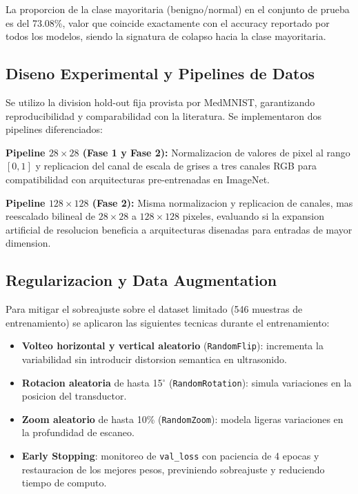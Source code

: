 \documentclass[12pt, a4paper]{article}
\begin{document}
La proporcion de la clase mayoritaria (benigno/normal) en el conjunto de prueba es del 73.08\%, valor que coincide exactamente con el accuracy reportado por todos los modelos, siendo la signatura de colapso hacia la clase mayoritaria.

\subsection{Diseno Experimental y Pipelines de Datos}

Se utilizo la division hold-out fija provista por MedMNIST, garantizando reproducibilidad y comparabilidad con la literatura. Se implementaron dos pipelines diferenciados:

\textbf{Pipeline $28\times28$ (Fase 1 y Fase 2):} Normalizacion de valores de pixel al rango $[0,1]$ y replicacion del canal de escala de grises a tres canales RGB para compatibilidad con arquitecturas pre-entrenadas en ImageNet.

\textbf{Pipeline $128\times128$ (Fase 2):} Misma normalizacion y replicacion de canales, mas reescalado bilineal de $28\times28$ a $128\times128$ pixeles, evaluando si la expansion artificial de resolucion beneficia a arquitecturas disenadas para entradas de mayor dimension.

\subsection{Regularizacion y Data Augmentation}

Para mitigar el sobreajuste sobre el dataset limitado (546 muestras de entrenamiento) se aplicaron las siguientes tecnicas durante el entrenamiento:

\begin{itemize}
    \item \textbf{Volteo horizontal y vertical aleatorio} (\texttt{RandomFlip}): incrementa la variabilidad sin introducir distorsion semantica en ultrasonido.
    \item \textbf{Rotacion aleatoria} de hasta 15$^\circ$ (\texttt{RandomRotation}): simula variaciones en la posicion del transductor.
    \item \textbf{Zoom aleatorio} de hasta 10\% (\texttt{RandomZoom}): modela ligeras variaciones en la profundidad de escaneo.
    \item \textbf{Early Stopping}: monitoreo de \texttt{val\_loss} con paciencia de 4 epocas y restauracion de los mejores pesos, previniendo sobreajuste y reduciendo tiempo de computo.
\end{itemize}
\end{document}
